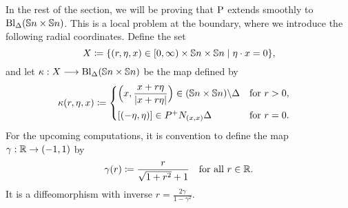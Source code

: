 \documentclass[\MainFolder/Text.tex]{subfiles}
\begin{document}
In the rest of the section, we will be proving that $\mathrm{P}$ extends smoothly to $\mathrm{Bl}_{\Delta}(\mathbb{S}{n}\times \mathbb{S}{n})$. This is a local problem at the boundary, where we introduce the following radial coordinates. Define the set
$$ X \coloneqq \{(r,\eta,x)\in [0,\infty)\times \mathbb{S}{n}\times\mathbb{S}{n} \mid \eta\cdot x = 0\}, $$
and let $\kappa: X \longrightarrow \mathrm{Bl}_\Delta(\mathbb{S}{n}\times \mathbb{S}{n})$ be the map defined by
\begin{align*}
\kappa(r,\eta,x) &\coloneqq \begin{cases} 
\Bigl(x,\dfrac{x+r\eta}{|x+r\eta|}\Bigr)\in (\mathbb{S}{n}\times \mathbb{S}{n})\backslash \Delta & \text{for }r>0, \\[2ex]
[(-\eta,\eta)]\in P^+ N_{(x,x)}\Delta & \text{for }r=0.
\end{cases}
\end{align*}
For the upcoming computations, it is convention to define the map $\gamma: \mathbb{R} \rightarrow (-1,1)$ by
$$ \gamma(r) \coloneqq \frac{r}{\sqrt{1+r^2}+1} \quad\text{for all }r\in \mathbb{R}. $$
It is a diffeomorphism with inverse $r = \frac{2 \gamma}{1-\gamma^2}$.
\end{document}
